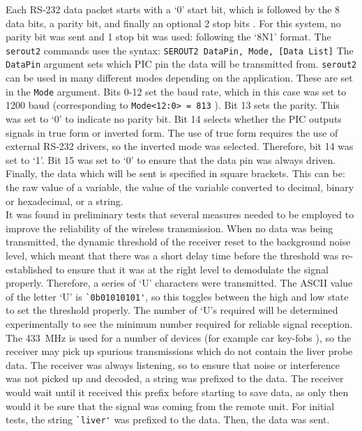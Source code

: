 Each RS-232 data packet starts with a `0' start bit, which is followed by the 8 data bits, a parity bit, and finally an optional 2 stop bits \cite{rs232}. For this system, no parity bit was sent and 1 stop bit was used: following the `8N1' format. The \verb|serout2| commands uses the syntax:
\verb|SEROUT2 DataPin, Mode, [Data List]|
The \verb|DataPin| argument sets which PIC pin the data will be transmitted from. \verb|serout2| can be used in many different modes depending on the application. These are set in the \verb|Mode| argument. Bits 0-12 set the baud rate, which in this case was set to 1200 baud (corresponding to \verb|Mode<12:0> = 813| \cite{picbasic_pro}). Bit 13 sets the parity. This was set to `0' to indicate no parity bit. Bit 14 selects whether the PIC outputs signals in true form or inverted form. The use of true form requires the use of external RS-232 drivers, so the inverted mode was selected. Therefore, bit 14 was set to `1'. Bit 15 was set to `0' to ensure that the data pin was always driven. Finally, the data which will be sent is specified in square brackets. This can be: the raw value of a variable, the value of the variable converted to decimal, binary or hexadecimal, or a string.\\

It was found in preliminary tests that several measures needed to be employed to improve the reliability of the wireless transmission. When no data was being transmitted, the dynamic threshold of the receiver reset to the background noise level, which meant that there was a short delay time before the threshold was re-established to ensure that it was at the right level to demodulate the signal properly. Therefore, a series of `U' characters were transmitted. The ASCII value of the letter `U' is \verb|`0b01010101'|, so this toggles between the high and low state to set the threshold properly. The number of `U's required will be determined experimentally to see the minimum number required for reliable signal reception. The \SI{433}{\mega\hertz} is used for a number of devices (for example car key-fobs \cite{qam-rx10}), so the receiver may pick up spurious transmissions which do not contain the liver probe data. The receiver was always listening, so to ensure that noise or interference was not picked up and decoded, a string was prefixed to the data. The receiver would wait until it received this prefix before starting to save data, as only then would it be sure that the signal was coming from the remote unit. For initial tests, the string \verb|`liver'| was prefixed to the data. Then, the data was sent. 

